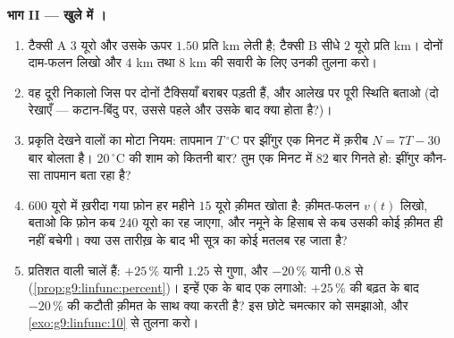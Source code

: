 \begin{problem}
\medskip
\noindent\textbf{भाग II --- खुले में ।}
\begin{enumerate}[resume]
  \item टैक्सी A $3$ यूरो और उसके ऊपर $1.50$ प्रति km लेती है;
        टैक्सी B सीधे $2$ यूरो प्रति km। दोनों दाम-फलन लिखो और $4$
        km तथा $8$ km की सवारी के लिए उनकी तुलना करो।
  \item वह दूरी निकालो जिस पर दोनों टैक्सियाँ बराबर पड़ती हैं, और
        आलेख पर पूरी स्थिति बताओ (दो रेखाएँ --- कटान-बिंदु पर, उससे
        पहले और उसके बाद क्या होता है?)।
  \item प्रकृति देखने वालों का मोटा नियम: तापमान $T\,^\circ$C पर
        झींगुर एक मिनट में क़रीब $N = 7T - 30$ बार बोलता है।
        $20\,^\circ$C की शाम को कितनी बार? तुम एक मिनट में $82$ बार
        गिनते हो: झींगुर कौन-सा तापमान बता रहा है?
  \item $600$ यूरो में ख़रीदा गया फ़ोन हर महीने $15$ यूरो क़ीमत खोता
        है: क़ीमत-फलन $v(t)$ लिखो, बताओ कि फ़ोन कब $240$ यूरो का रह
        जाएगा, और नमूने के हिसाब से कब उसकी कोई क़ीमत ही नहीं
        बचेगी। क्या उस तारीख़ के बाद भी सूत्र का कोई मतलब रह जाता
        है?
  \item प्रतिशत वाली चालें  हैं: $+25\,\%$ यानी $1.25$ से
        गुणा, और $-20\,\%$ यानी $0.8$ से
        (\cref{prop:g9:linfunc:percent})। इन्हें एक के बाद एक लगाओ:
        $+25\,\%$ की बढ़त के बाद $-20\,\%$ की कटौती क़ीमत के साथ क्या
        करती है? इस छोटे चमत्कार को समझाओ, और
        \cref{exo:g9:linfunc:10} से तुलना करो।
\end{enumerate}


\end{problem}
